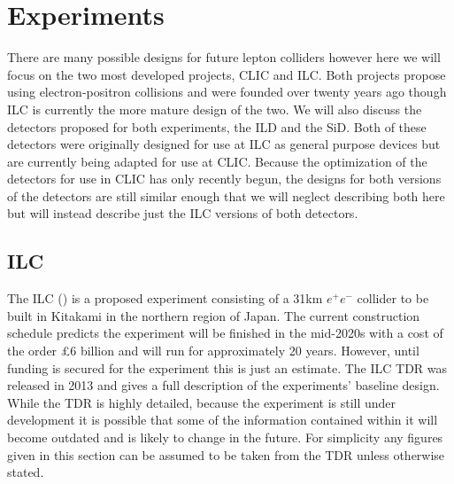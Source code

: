 \chapter{Experiments}


There are many possible designs for future lepton colliders \cite{Lipton:2012du,Koratzinos:2014cla} however here we will focus on the two most developed projects, \ac{CLIC} and \ac{ILC}. Both projects propose using electron-positron collisions and were founded over twenty years ago though \ac{ILC} is currently the more mature design of the two. We will also discuss the detectors proposed for both experiments, the \ac{ILD} and the \ac{SiD}. Both of these detectors were originally designed for use at \ac{ILC} as general purpose devices but are currently being adapted for use at \ac{CLIC}. Because the optimization of the detectors for use in \ac{CLIC} has only recently begun, the designs for both versions of the detectors are still similar enough that we will neglect describing both here but will instead describe just the \ac{ILC} versions of both detectors.

\section{ILC}

The ILC () is a proposed experiment consisting of a 31km ${e^+e^-}$ collider to be built in Kitakami in the northern region of Japan. The current construction schedule predicts the experiment will be finished in the mid-2020s with a cost of the order \pounds6 billion and will run for approximately 20 years. However, until funding is secured for the experiment this is just an estimate. The \ac{ILC} \ac{TDR} \cite{ILCTDR} was released in 2013 and gives a full description of the experiments' baseline design. While the \ac{TDR} is highly detailed, because the experiment is still under development it is possible that some of the information contained within it will become outdated and is likely to change in the future. For simplicity any figures given in this section can be assumed to be taken from the \ac{TDR} unless otherwise stated.

